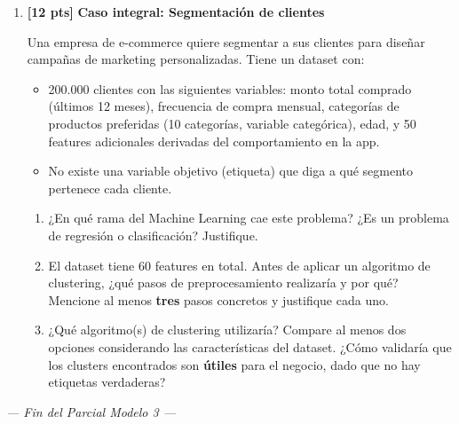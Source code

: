 \documentclass[11pt,a4paper]{article}
\newcommand{\puntaje}[1]{\textbf{[#1 pts]}}
\begin{document}
\begin{enumerate}[label=\textbf{\arabic*.}, leftmargin=*, itemsep=10pt]
\item \puntaje{12} \textbf{Caso integral: Segmentaci\'on de clientes}

Una empresa de e-commerce quiere segmentar a sus clientes para dise\~nar campa\~nas de marketing personalizadas. Tiene un dataset con:
\begin{itemize}
  \item 200.000 clientes con las siguientes variables: monto total comprado (\'ultimos 12 meses), frecuencia de compra mensual, categor\'ias de productos preferidas (10 categor\'ias, variable categ\'orica), edad, y 50 features adicionales derivadas del comportamiento en la app.
  \item No existe una variable objetivo (etiqueta) que diga a qu\'e segmento pertenece cada cliente.
\end{itemize}

\begin{enumerate}[label=\textbf{\alph*)}]
  \item ¿En qu\'e rama del Machine Learning cae este problema? ¿Es un problema de regresi\'on o clasificaci\'on? Justifique.
  \vspace{3cm}
  \item El dataset tiene 60 features en total. Antes de aplicar un algoritmo de clustering, ¿qu\'e pasos de preprocesamiento realizar\'ia y por qu\'e? Mencione al menos \textbf{tres} pasos concretos y justifique cada uno.
  \vspace{4cm}
  \item ¿Qu\'e algoritmo(s) de clustering utilizar\'ia? Compare al menos dos opciones considerando las caracter\'isticas del dataset. ¿C\'omo validar\'ia que los clusters encontrados son \textbf{\'utiles} para el negocio, dado que no hay etiquetas verdaderas?
  \vspace{4cm}
\end{enumerate}

\end{enumerate}

\vspace{1cm}
\begin{center}
\textit{--- Fin del Parcial Modelo 3 ---}
\end{center}
\end{document}
